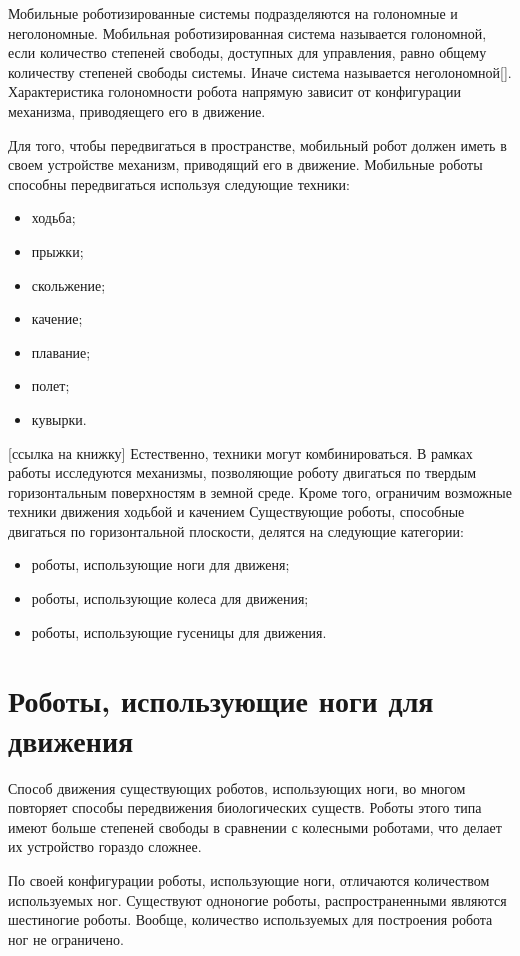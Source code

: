 \documentclass[oneside,final,14pt]{extreport}
\begin{document}
Мобильные роботизированные системы подразделяются на голономные и неголономные. Мобильная роботизированная система называется голономной, если количество степеней свободы, доступных для управления, равно общему количеству степеней свободы системы. Иначе система называется неголономной[]. Характеристика голономности робота напрямую зависит от конфигурации механизма, приводяещего его в движение.
 
Для того, чтобы передвигаться в пространстве, мобильный робот должен иметь в своем устройстве механизм, приводящий его в движение. Мобильные роботы способны передвигаться используя следующие техники:
\begin{itemize}
\item ходьба;
\item прыжки;
\item скольжение;
\item качение;
\item плавание;
\item полет;
\item кувырки.
\end{itemize}
[ссылка на книжку]
Естественно, техники могут комбинироваться. 
 В рамках работы исследуются механизмы, позволяющие роботу двигаться по твердым горизонтальным поверхностям в земной среде. Кроме того, ограничим возможные техники движения ходьбой и качением Существующие роботы, способные двигаться по горизонтальной плоскости, делятся на следующие категории:
\begin{itemize}
\item роботы, использующие ноги для движеня;
\item роботы, использующие колеса для движения;
\item роботы, использующие гусеницы для движения.
\end{itemize} 
\section{Роботы, использующие ноги для движения}
Способ движения существующих роботов, использующих ноги, во многом повторяет способы передвижения биологических существ. Роботы этого типа имеют больше степеней свободы в сравнении с колесными роботами, что делает их устройство гораздо сложнее.

По своей конфигурации роботы, использующие ноги, отличаются количеством используемых ног. Существуют одноногие роботы, распространенными являются шестиногие роботы. Вообще, количество используемых для построения робота ног не ограничено. 
\end{document}
